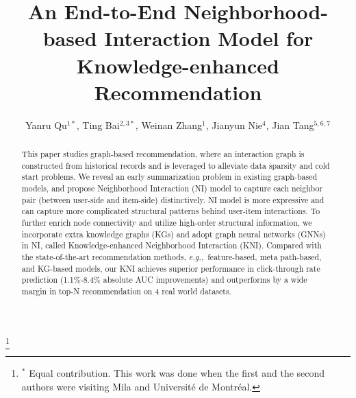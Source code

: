 \documentclass[sigconf]{acmart}
\newcommand{\new}[1]{{\color{black} #1}}
\newcommand{\eg}{\emph{e.g.},~}
\begin{document}
\title[]{An End-to-End Neighborhood-based Interaction Model for Knowledge-enhanced Recommendation}

\author{Yanru Qu$^{1*}$, Ting Bai$^{2,3*}$, Weinan Zhang$^{1}$, Jianyun Nie$^{4}$, Jian Tang$^{5,6,7}$} \thanks{$^*$ Equal contribution. This work was done when the first and the second authors were visiting Mila and Universit\'e de Montr\'eal.}

\renewcommand{\shortauthors}{}

\begin{abstract}
\new{This paper studies graph-based recommendation, where an interaction graph is constructed from historical records and is leveraged to alleviate data sparsity and cold start problems. We reveal an early summarization problem in existing graph-based models, and propose Neighborhood Interaction (NI) model to capture each neighbor pair (between user-side and item-side) distinctively. NI model is more expressive and can capture more complicated structural patterns behind user-item interactions. To further enrich node connectivity and utilize high-order structural information, we incorporate extra knowledge graphs (KGs) and adopt graph neural networks (GNNs) in NI, called Knowledge-enhanced Neighborhood Interaction (KNI).
Compared with the state-of-the-art recommendation methods, \eg feature-based, meta path-based, and KG-based models, our KNI achieves superior performance in click-through rate prediction (1.1\%-8.4\% absolute AUC improvements) and outperforms by a wide margin in top-N recommendation on 4 real world datasets. 
}
\end{abstract}



\acmPrice{}
\end{document}
